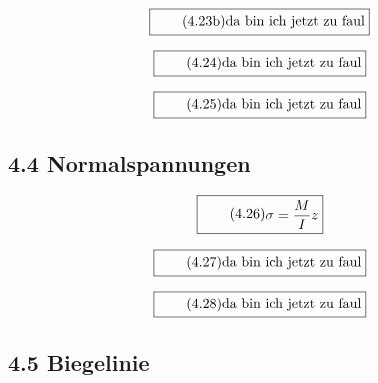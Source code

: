 \documentclass[11pt]{article}
\newcommand{\1}{ {\mathds{1}} }
\begin{document}
    \begin{equation}
      \boxed{
        \tag{4.23b}
        \begin{split}
          \text{da bin ich jetzt zu faul}
        \end{split}
      }
    \end{equation}

    \begin{equation}
      \boxed{
        \tag{4.24}
        \begin{split}
          \text{da bin ich jetzt zu faul}
        \end{split}
      }
    \end{equation}

    \begin{equation}
      \boxed{
        \tag{4.25}
        \begin{split}
          \text{da bin ich jetzt zu faul}
        \end{split}
      }
    \end{equation}
    
    \subsection*{4.4 Normalspannungen}

    \begin{equation}
      \boxed{
        \tag{4.26}
        \begin{split}
          \sigma
          =
          \frac{M}{I}
          z
        \end{split}
      }
    \end{equation}
    
    \begin{equation}
      \boxed{
        \tag{4.27}
        \begin{split}
          \text{da bin ich jetzt zu faul}
        \end{split}
      }
    \end{equation}

    \begin{equation}
      \boxed{
        \tag{4.28}
        \begin{split}
          \text{da bin ich jetzt zu faul}
        \end{split}
      }
    \end{equation}
    
    \subsection*{4.5 Biegelinie}
\end{document}
